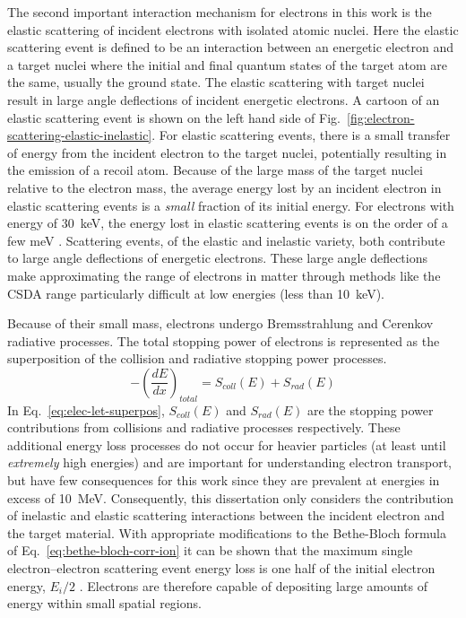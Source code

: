 The second important interaction mechanism for electrons in this work is the elastic scattering of incident electrons with isolated atomic nuclei.
Here the elastic scattering event is defined to be an interaction between an energetic electron and a target nuclei where the initial and final quantum states of the target atom are the same, usually the ground state.
The elastic scattering with target nuclei result in large angle deflections of incident energetic electrons.
A cartoon of an elastic scattering event is shown on the left hand side of Fig.~\ref{fig:electron-scattering-elastic-inelastic}.
For elastic scattering events, there is a small transfer of energy from the incident electron to the target nuclei, potentially resulting in the emission of a recoil atom.
Because of the large mass of the target nuclei relative to the electron mass, the average energy lost by an incident electron in elastic scattering events is a \emph{small} fraction of its initial energy.
For electrons with energy of 30~keV, the energy lost in elastic scattering events is on the order of a few meV \cite{Salvat:ue}.
Scattering events, of the elastic and inelastic variety, both contribute to large angle deflections of energetic electrons.
These large angle deflections make approximating the range of electrons in matter through methods like the CSDA range particularly difficult at low energies (less than 10~keV).

Because of their small mass, electrons undergo Bremsstrahlung and Cerenkov radiative processes.
The total stopping power of electrons is represented as the superposition of the collision and radiative stopping power processes.
\begin{equation}
    \label{eq:elec-let-superpos}
    -\left(\frac{dE}{dx}\right)_{total} = S_{coll}(E) + S_{rad}(E)
\end{equation}
In Eq.~\ref{eq:elec-let-superpos}, $S_{coll}(E)$ and $S_{rad}(E)$ are the stopping power contributions from collisions and radiative processes respectively.
These additional energy loss processes do not occur for heavier particles (at least until \emph{extremely} high energies) and are important for understanding electron transport, but have few consequences for this work since they are prevalent at energies in excess of 10~MeV.
Consequently, this dissertation only considers the contribution of inelastic and elastic scattering interactions between the incident electron and the target material.
With appropriate modifications to the Bethe-Bloch formula of Eq.~\ref{eq:bethe-bloch-corr-ion} it can be shown that the maximum single electron--electron scattering event energy loss is one half of the initial electron energy, $E_i/2$ \cite{segre1964nuclei,1982spre.reptR....B,Salvat:ue}.
Electrons are therefore capable of depositing large amounts of energy within small spatial regions.

